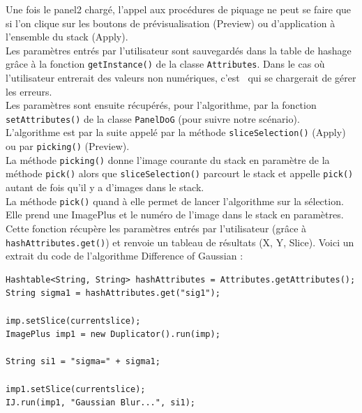 Une fois le panel2 chargé, l'appel aux procédures de piquage ne peut se faire que si l'on clique sur les boutons de prévisualisation (Preview) ou d'application à l'ensemble du stack (Apply). \\
Les paramètres entrés par l'utilisateur sont sauvegardés dans la table de hashage grâce à la fonction \texttt{getInstance()} de la classe \texttt{Attributes}. Dans le cas où l'utilisateur entrerait des valeurs non numériques, c'est \imj ~qui se chargerait de gérer les erreurs. \\
Les paramètres sont ensuite récupérés, pour l'algorithme, par la fonction \texttt{setAttributes()} de la classe \texttt{PanelDoG} (pour suivre notre scénario). \\
 L'algorithme est par la suite appelé par la méthode \texttt{sliceSelection()} (Apply) ou par \texttt{picking()} (Preview). \\

La méthode \texttt{picking()} donne l'image courante du stack en paramètre de la méthode \texttt{pick()} alors que \texttt{sliceSelection()} parcourt le stack et appelle \texttt{pick()} autant de fois qu'il y a d'images dans le stack. \\

La méthode \texttt{pick()} quand à elle permet de lancer l'algorithme sur la sélection. Elle prend une ImagePlus et le numéro de l'image dans le stack en paramètres. Cette fonction récupère les paramètres entrés par l'utilisateur (grâce à \texttt{hashAttributes.get()}) et renvoie un tableau de résultats (X, Y, Slice). Voici un extrait du code de l'algorithme Difference of Gaussian :

\begin{center}
\begin{fmpage}{16cm}
\begin{small}
\begin{lstlisting}
Hashtable<String, String> hashAttributes = Attributes.getAttributes();
String sigma1 = hashAttributes.get("sig1");

imp.setSlice(currentslice);
ImagePlus imp1 = new Duplicator().run(imp);

String si1 = "sigma=" + sigma1;

imp1.setSlice(currentslice);
IJ.run(imp1, "Gaussian Blur...", si1);
\end{lstlisting}
\end{small}
\end{fmpage}
\end{center}

